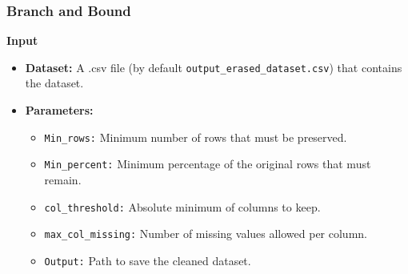 \documentclass[a4paper,12pt]{article}
\begin{document}

\subsubsection{Branch and Bound}
\textbf{Input}
\begin{itemize}
    \item \textbf{Dataset:} A .csv file (by default \texttt{output\_erased\_dataset.csv}) that contains the dataset.
    \item \textbf{Parameters:}
    \begin{itemize}
        \item \texttt{Min\_rows:} Minimum number of rows that must be preserved.
        \item \texttt{Min\_percent:} Minimum percentage of the original rows that must remain.
        \item \texttt{col\_threshold:} Absolute minimum of columns to keep.
        \item \texttt{max\_col\_missing:} Number of missing values allowed per column.
        \item \texttt{Output:} Path to save the cleaned dataset.
    \end{itemize}
\end{itemize}
\end{document}
